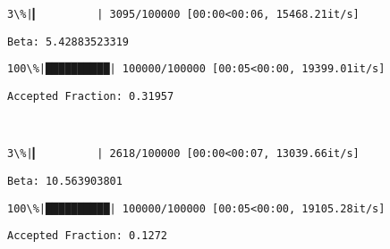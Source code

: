 \documentclass[11pt]{article}
\begin{document}
    \begin{Verbatim}[commandchars=\\\{\}]
  3\%|▎         | 3095/100000 [00:00<00:06, 15468.21it/s]
    \end{Verbatim}

    \begin{Verbatim}[commandchars=\\\{\}]
Beta: 5.42883523319

    \end{Verbatim}

    \begin{Verbatim}[commandchars=\\\{\}]
100\%|██████████| 100000/100000 [00:05<00:00, 19399.01it/s]

    \end{Verbatim}

    \begin{Verbatim}[commandchars=\\\{\}]
Accepted Fraction: 0.31957

    \end{Verbatim}

    \begin{center}
    \end{center}
    { \hspace*{\fill} \\}
    
    \begin{Verbatim}[commandchars=\\\{\}]
  3\%|▎         | 2618/100000 [00:00<00:07, 13039.66it/s]
    \end{Verbatim}

    \begin{Verbatim}[commandchars=\\\{\}]
Beta: 10.563903801

    \end{Verbatim}

    \begin{Verbatim}[commandchars=\\\{\}]
100\%|██████████| 100000/100000 [00:05<00:00, 19105.28it/s]

    \end{Verbatim}

    \begin{Verbatim}[commandchars=\\\{\}]
Accepted Fraction: 0.1272

    \end{Verbatim}
\end{document}
